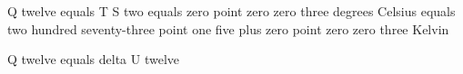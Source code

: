 Q twelve equals T S two equals zero point zero zero three degrees Celsius equals two hundred seventy-three point one five plus zero point zero zero three Kelvin  

Q twelve equals delta U twelve
